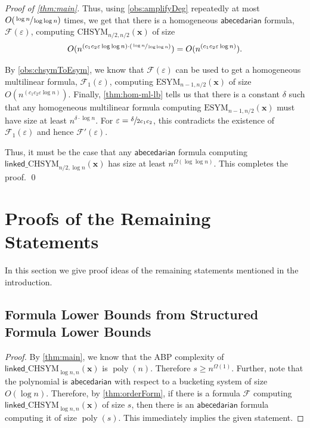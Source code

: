 \documentclass[10pt,a4paper]{article}
\def\poly{\operatorname{poly}}
\def\vecx{\mathbf{x}}
\newcommand{\form}{\textbf{$\mathcal{F}$}}
\renewcommand{\epsilon}{\varepsilon}
\newcommand{\abcd}{\mathsf{abecedarian}}
\newcommand{\esym}[2]{\mathrm{ESYM}_{#1,#2}}
\newcommand{\chsym}[2]{\mathrm{CHSYM}_{#1,#2}}
\newcommand{\lchsym}[2]{\mathrm{\mathsf{linked}\_CHSYM}_{#1,#2}}
\newenvironment{proofof}[1]{\medskip\noindent\emph{Proof of #1.}\hspace*{1em}}{\qed\bigskip}
\begin{document}
\begin{proofof}{\autoref{thm:main}}
	Thus, using \autoref{obs:amplifyDeg} repeatedly at most $O(\sfrac{\log n}{\log \log n})$ times, we get that there is a homogeneous $\abcd$ formula, $\form(\epsilon)$, computing $\chsym{n/2}{n/2}(\vecx)$ of size
	\[
		O(n^{(c_1 c_2 \epsilon \log \log n) \cdot (\sfrac{\log n}{\log \log n})}) = O(n^{(c_1 c_2 \epsilon \log n)}).
	\]
	
	By \autoref{obs:chsymToEsym}, we know that $\form(\epsilon)$ can be used to get a homogeneous multilinear formula, $\form_1(\epsilon)$, computing $\esym{n-1}{n/2}(\vecx)$ of size $O(n^{(c_1 c_2 \epsilon \log n)})$.
	Finally, \autoref{thm:hom-ml-lb} tells us that there is a constant $\delta$ such that any homogeneous multilinear formula computing $\esym{n-1}{n/2}(\vecx)$ must have size at least $n^{\delta \cdot \log n}$.	
	For $\epsilon = \sfrac{\delta}{2 c_1 c_2}$, this contradicts the existence of $\form_1(\epsilon)$ and hence $\form'(\epsilon)$.

	Thus, it must be the case that any $\abcd$ formula computing $\lchsym{n/2}{\log n}(\vecx)$ has size at least $n^{\Omega(\log \log n)}$.
	This completes the proof.
\end{proofof}


\section{Proofs of the Remaining Statements}\label{sec:simpleStatements}

In this section we give proof ideas of the remaining statements mentioned in the introduction.

\subsection{Formula Lower Bounds from Structured Formula Lower Bounds}\label{sec:FormLBfromOrdFormLB}

\FormLBfromOrdFormLB*

\begin{proof}
	By \autoref{thm:main}, we know that the ABP complexity of $\lchsym{\log n}{n}(\vecx)$ is $\poly(n)$.
	Therefore $s \geq n^{\Omega(1)}$.
	Further, note that the polynomial is $\abcd$ with respect to a bucketing system of size $O(\log n)$.
	Therefore, by \autoref{thm:orderForm}, if there is a formula $\form$ computing $\lchsym{\log n}{n}(\vecx)$ of size $s$, then there is an $\abcd$ formula computing it of size $\poly(s)$.
	This immediately implies the given statement.
\end{proof}
\end{document}
